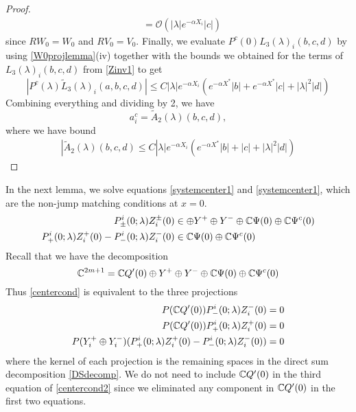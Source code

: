 \documentclass[thesis.tex]{subfiles}
\begin{document}
\begin{lemma}
\begin{proof}
\begin{align*}
&= \mathcal{O}(|\lambda|e^{-\alpha X_i}|c| )
\end{align*}
since $R W_0 = W_0$ and $RV_0 = V_0$. Finally, we evaluate $P^c(0)L_3(\lambda)_i(b,c,d)$ by using \cref{W0projlemma}(iv) together with the bounds we obtained for the terms of $L_3(\lambda)_i(b,c,d)$ from \cref{Zinv1} to get 
\begin{equation*}
|P^c(\lambda)\tilde{L}_3(\lambda)_i(a,b,c,d)| \leq C |\lambda| e^{-\alpha X_i} \left( e^{-\alpha X^*} |b| + e^{-\alpha X^*} |c| + |\lambda|^2 |d| \right)
\end{equation*}
Combining everything and dividing by 2, we have 
\begin{equation*}
a_i^c = \tilde{A}_2(\lambda)(b, c, d),
\end{equation*}
where we have bound
\begin{align*}
|\tilde{A}_2(\lambda)(b, c, d) \leq C |\lambda| e^{-\alpha X_i} \left( e^{-\alpha X^*}  |b| + |c| +|\lambda|^2 |d| \right)
\end{align*}
\end{proof}
\end{lemma}

In the next lemma, we solve equations \cref{systemcenter1} and \cref{systemcenter1}, which are the non-jump matching conditions at $x = 0$.
\begin{equation}\label{centercond}
\begin{aligned}
P^i_\pm(0; \lambda) Z_i^\pm(0) &\in \oplus Y^+ \oplus Y^- \oplus \mathbb{C} \Psi(0) \oplus \mathbb{C} \Psi^c(0) \\
P^i_+(0; \lambda) Z_i^+(0) - P^i_-(0; \lambda) Z_i^-(0) &\in \mathbb{C} \Psi(0) \oplus \mathbb{C} \Psi^c(0)
\end{aligned}
\end{equation}
Recall that we have the decomposition
\begin{equation}\label{DSdecomp}
\mathbb{C}^{2m+1} = \mathbb{C} Q'(0) \oplus Y^+ \oplus Y^- \oplus \mathbb{C} \Psi(0) \oplus \mathbb{C} \Psi^c(0)
\end{equation}
Thus \eqref{centercond} is equivalent to the three projections
\begin{equation}\label{centercond2}
\begin{aligned}
P(\mathbb{C} Q'(0) ) P^i_-(0; \lambda) Z_i^-(0) &= 0 \\
P(\mathbb{C} Q'(0) ) P^i_+(0; \lambda) Z_i^+(0) &= 0 \\
P(Y_i^+ \oplus Y_i^-) ( P^i_+(0; \lambda) Z_i^+(0) - P^i_-(0; \lambda) Z_i^-(0) ) &= 0
\end{aligned}
\end{equation}
where the kernel of each projection is the remaining spaces in the direct sum decomposition \eqref{DSdecomp}. We do not need to include $\mathbb{C} Q'(0)$ in the third equation of \eqref{centercond2} since we eliminated any component in $\mathbb{C} Q'(0)$ in the first two equations.
\end{document}
